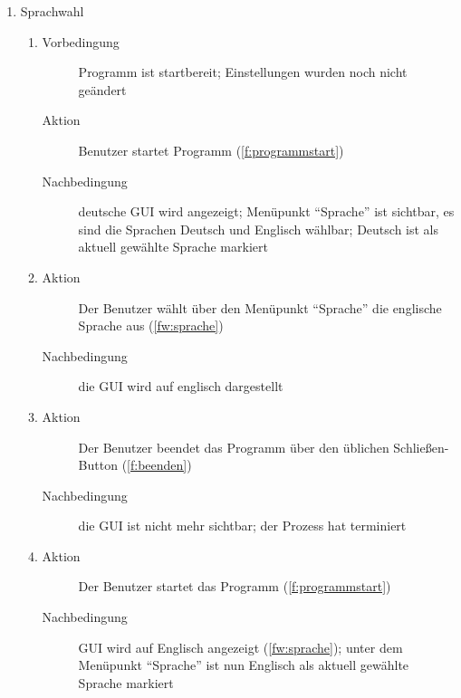 \begin{enumerate} [label=\bfseries /TSW \arabic*0/, leftmargin=*]
	\item Sprachwahl
	\begin{enumerate}
		\item
		\begin{description}
			\item[Vorbedingung] Programm ist startbereit; Einstellungen wurden noch nicht geändert
			\item[Aktion] Benutzer startet Programm (\ref{f:programmstart})
			\item[Nachbedingung] deutsche GUI wird angezeigt; Menüpunkt \enquote{Sprache} ist sichtbar, es sind die Sprachen Deutsch und Englisch wählbar; Deutsch ist als aktuell gewählte Sprache markiert
		\end{description}
		\item
		\begin{description}
			\item[Aktion] Der Benutzer wählt über den Menüpunkt \enquote{Sprache} die englische Sprache aus (\ref{fw:sprache})
			\item[Nachbedingung] die GUI wird auf englisch dargestellt
		\end{description}
		\item
		\begin{description}
			\item[Aktion] Der Benutzer beendet das Programm über den üblichen Schließen-Button (\ref{f:beenden})
			\item[Nachbedingung] die GUI ist nicht mehr sichtbar; der Prozess hat terminiert
		\end{description}
		\item
		\begin{description}
			\item[Aktion] Der Benutzer startet das Programm (\ref{f:programmstart})
			\item[Nachbedingung] GUI wird auf Englisch angezeigt (\ref{fw:sprache}); unter dem Menüpunkt \enquote{Sprache} ist nun Englisch als aktuell gewählte Sprache markiert
		\end{description}
	\end{enumerate}


\end{enumerate}
